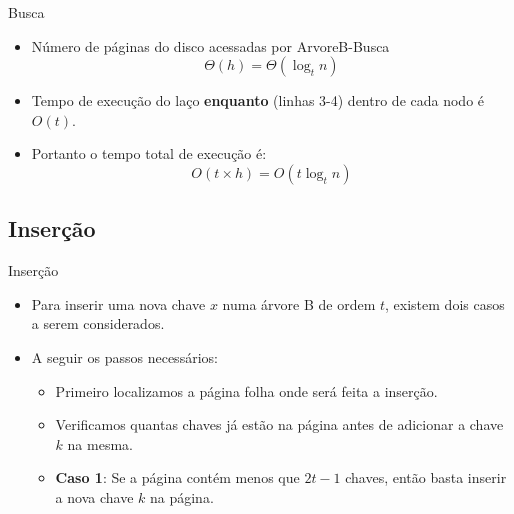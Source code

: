 \documentclass[aspectratio=169]{beamer}
\begin{document}
{\begin{frame}{Busca}
\begin{itemize}
 \item Número de páginas do disco acessadas por ArvoreB-Busca
 \begin{equation}
  \Theta(h) = \Theta(\log_t n) \nonumber
 \end{equation}
 \item Tempo de execução do laço {\bf enquanto} (linhas 3-4) dentro de cada nodo é $O(t)$.
 \item Portanto o tempo total de execução é:
 \begin{equation}
  O(t \times h) = O(t \log_t n) \nonumber
 \end{equation}
\end{itemize}
\end{frame}

\subsection{Inserção}

\begin{frame}{Inserção}
\begin{itemize}
 \item Para inserir uma nova chave $x$ numa árvore B de ordem $t$, existem dois casos a serem considerados.
 \item  A seguir os passos necessários:
 \begin{itemize}
 \item Primeiro localizamos a página folha onde será feita a inserção.
 \item Verificamos quantas chaves já estão na página antes de adicionar a chave $k$ na mesma.
 \item {\bf Caso 1}: Se a página contém menos que $2t-1$ chaves, então basta inserir a nova chave $k$ na página.
 \end{itemize}
\end{itemize}
\end{frame}


}
\end{document}

